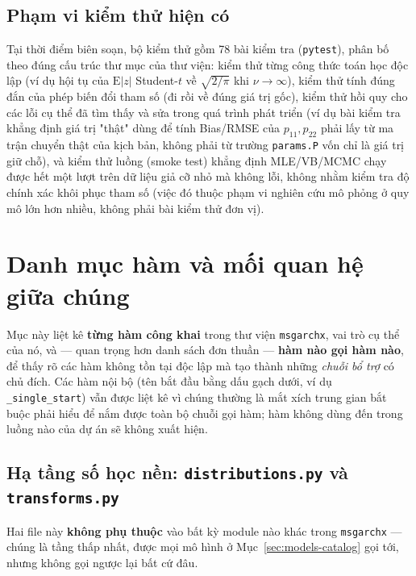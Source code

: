 \documentclass[11pt,a4paper]{article}
\newcommand{\code}[1]{\texttt{#1}}
\newcommand{\file}[1]{\texttt{#1}}
\begin{document}
\subsection{Phạm vi kiểm thử hiện có}

Tại thời điểm biên soạn, bộ kiểm thử gồm 78 bài kiểm tra (\code{pytest}), phân bố
theo đúng cấu trúc thư mục của thư viện: kiểm thử từng công thức toán học độc lập
(ví dụ hội tụ của $\mathrm E|z|$ Student-$t$ về $\sqrt{2/\pi}$ khi $\nu\to\infty$),
kiểm thử tính đúng đắn của phép biến đổi tham số (đi rồi về đúng giá trị gốc), kiểm
thử hồi quy cho các lỗi cụ thể đã tìm thấy và sửa trong quá trình phát triển (ví dụ
bài kiểm tra khẳng định giá trị "thật" dùng để tính Bias/RMSE của $p_{11},p_{22}$
phải lấy từ ma trận chuyển thật của kịch bản, không phải từ trường \code{params.P}
vốn chỉ là giá trị giữ chỗ), và kiểm thử luồng (smoke test) khẳng định MLE/VB/MCMC
chạy được hết một lượt trên dữ liệu giả cỡ nhỏ mà không lỗi, không nhằm kiểm tra độ
chính xác khôi phục tham số (việc đó thuộc phạm vi nghiên cứu mô phỏng ở quy mô lớn
hơn nhiều, không phải bài kiểm thử đơn vị).

\section{Danh mục hàm và mối quan hệ giữa chúng}
\label{sec:function-catalog}

Mục này liệt kê \textbf{từng hàm công khai} trong thư viện \code{msgarchx}, vai trò
cụ thể của nó, và --- quan trọng hơn danh sách đơn thuần --- \textbf{hàm nào gọi hàm
nào}, để thấy rõ các hàm không tồn tại độc lập mà tạo thành những \emph{chuỗi bổ trợ}
có chủ đích. Các hàm nội bộ (tên bắt đầu bằng dấu gạch dưới, ví dụ \code{\_single\_start})
vẫn được liệt kê vì chúng thường là mắt xích trung gian bắt buộc phải hiểu để nắm được
toàn bộ chuỗi gọi hàm; hàm không dùng đến trong luồng nào của dự án sẽ không xuất hiện.

\subsection{Hạ tầng số học nền: \file{distributions.py} và \file{transforms.py}}

Hai file này \textbf{không phụ thuộc} vào bất kỳ module nào khác trong
\code{msgarchx} --- chúng là tầng thấp nhất, được mọi mô hình ở Mục~\ref{sec:models-catalog}
gọi tới, nhưng không gọi ngược lại bất cứ đâu.
\end{document}
